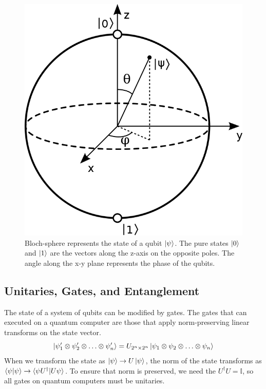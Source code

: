 \begin{figure}[ht]
    \centering
    \includegraphics[width=0.4\linewidth]{figures/quantum/bloch_sphere.png}
    \caption[Block Sphere representation of Quantum States]{Bloch-sphere represents the state of a qubit $\ket{\psi}$. The pure states $\ket{0}$ and $\ket{1}$ are the vectors along the z-axis on the opposite poles. The angle along the x-y plane represents the phase of the qubits.}
    \label{fig:bloch-sphere}
\end{figure}


\subsection{Unitaries, Gates, and Entanglement}
\label{sec:background-unitary-gate-entanglement}

The state of a system of qubits can be modified by gates. The  gates that can executed on a quantum computer are those that apply norm-preserving linear transforms on the state vector.
\begin{equation}\label{eqn:gates-transforming-qubits}
    \ket{\psi_1^\prime \otimes \psi_2^\prime \otimes \ldots \otimes \psi_n^\prime} = U_{2^n \times 2^n} \ket{\psi_1 \otimes \psi_2 \otimes \ldots \otimes \psi_n}
\end{equation}
When we transform the state as $\ket{\psi} \rightarrow U \ket{\psi}$, the norm of the state transforms as $\braket{\psi | \psi} \rightarrow \braket{\psi U^\dagger \vert U \psi}$. To ensure that norm is preserved, we need the $U^\dagger U = \mathbb{I}$, so all gates on quantum computers must be unitaries.

